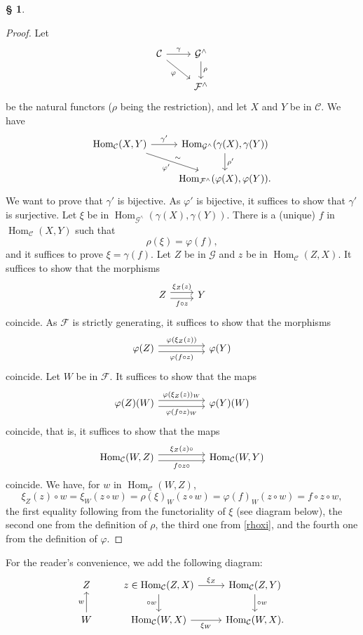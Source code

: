 \documentclass[12pt]{article}%
\theoremstyle{remark}
\theoremstyle{definition}
\newtheorem{s}[thm]{\S}%
\newcommand{\C}{\mathcal C}
\newcommand{\F}{\mathcal F}
\newcommand{\G}{\mathcal G}
\newcommand{\pp}{\varphi}
\DeclareMathOperator{\Hom}{Hom}%
\begin{document}
\begin{s}
\begin{proof}
Let 
$$
\begin{tikzcd}
\C\ar{r}{\gamma}\ar{dr}[swap]{\pp}&\G^\wedge\ar{d}{\rho}\\
&\F^\wedge
\end{tikzcd}
$$ 
be the natural functors ($\rho$ being the restriction), and let $X$ and $Y$ be in $\C$. We have 
$$
\begin{tikzcd}
\Hom_\C(X,Y)\ar{r}{\gamma'}\ar{dr}{\sim}[swap]{\pp'}&\Hom_{\G^\wedge}(\gamma(X),\gamma(Y))\ar{d}{\rho'}\\ 
{}&\Hom_{\F^\wedge}(\pp(X),\pp(Y)). 
\end{tikzcd}
$$ 
We want to prove that $\gamma'$ is bijective. As $\pp'$ is bijective, it suffices to show that $\gamma'$ is surjective. Let $\xi$ be in $\Hom_{\G^\wedge}(\gamma(X),\gamma(Y))$. There is a (unique) $f$ in $\Hom_\C(X,Y)$ such that  
\begin{equation}\label{rhoxi}
\rho(\xi)=\pp(f),
\end{equation}
and it suffices to prove $\xi=\gamma(f)$. Let $Z$ be in $\G$ and $z$ be in $\Hom_\C(Z,X)$. It suffices to show that the morphisms 
$$
\begin{tikzcd}
Z\arrow[yshift=0.7ex]{r}{\xi_Z(z)}\arrow[yshift=-0.7ex]{r}[swap]{f\circ z}&Y
\end{tikzcd}
$$ 
coincide. As $\F$ is strictly generating, it suffices to show that the morphisms 
$$
\begin{tikzcd}
\pp(Z)\arrow[yshift=0.7ex]{rr}{\pp(\xi_Z(z))}\arrow[yshift=-0.7ex]{rr}[swap]{\pp(f\circ z)}&&\pp(Y)
\end{tikzcd}
$$ 
coincide. Let $W$ be in $\F$. It suffices to show that the maps 
$$
\begin{tikzcd}
\pp(Z)(W)\arrow[yshift=0.7ex]{rr}{\pp(\xi_Z(z))_W}\arrow[yshift=-0.7ex]{rr}[swap]{\pp(f\circ z)_W}&&\pp(Y)(W)
\end{tikzcd}
$$ 
coincide, that is, it suffices to show that the maps 
$$
\begin{tikzcd}
\Hom_\C(W,Z)\arrow[yshift=0.7ex]{rr}{\xi_Z(z)\circ}\arrow[yshift=-0.7ex]{rr}[swap]{f\circ z\circ}&&\Hom_\C(W,Y)
\end{tikzcd}
$$ 
coincide. We have, for $w$ in $\Hom_\C(W,Z)$,
$$
\xi_Z(z)\circ w=\xi_W(z\circ w)=\rho(\xi)_W(z\circ w)=\pp(f)_W(z\circ w)
=f\circ z\circ w, 
$$ 
the first equality following from the functoriality of $\xi$ (see diagram below), the second one from the definition of $\rho$, the third one from \eqref{rhoxi}, and the fourth one from the definition of $\pp$.
\end{proof}
For the reader's convenience, we add the following diagram:
$$
\begin{tikzcd}
Z&z\in\Hom_\C(Z,X)\ar{r}{\xi_Z}\ar{d}[swap]{\circ w}&\Hom_\C(Z,Y)\ar{d}{\circ w}\\ 
W\ar{u}{w}&\Hom_\C(W,X)\ar{r}[swap]{\xi_W}&\Hom_\C(W,X).
\end{tikzcd}
$$
\end{s}
\end{document}
